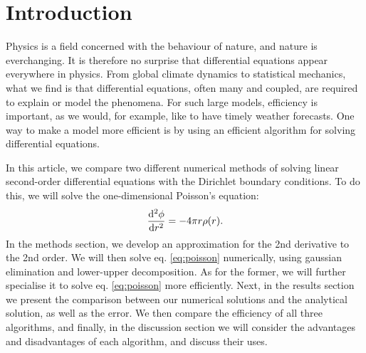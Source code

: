 \section{Introduction}
\label{sec:introduction}

Physics is a field concerned with the behaviour of nature, and nature is
everchanging. It is therefore no surprise that differential equations appear
everywhere in physics. From global climate dynamics to statistical mechanics,
what we find is that differential equations, often many and coupled, are
required to explain or model the phenomena. For such large models, efficiency
is important, as we would, for example, like to have timely weather forecasts.
One way to make a model more efficient is by using an efficient algorithm for
solving differential equations.

In this article, we compare two different numerical methods of solving linear
second-order differential equations with the Dirichlet boundary conditions.
To do this, we will solve the one-dimensional Poisson's equation:
  \begin{equation}
  \label{eq:poisson}
    \dv[2]{\phi}{r} = -4\pi r \rho\qty(r).
  \end{equation}
In the methods section, we develop an approximation for the
2nd derivative to the 2nd order. We will then solve eq. \ref{eq:poisson}
numerically, using gaussian elimination and lower-upper decomposition. As for
the former, we will further specialise it to solve eq. \ref{eq:poisson} more
efficiently. Next, in the results section we present the comparison
between our numerical solutions and the analytical solution, as well as the error.
We then compare the efficiency of all three algorithms, and finally, in the
discussion section we will consider the advantages and disadvantages
of each algorithm, and discuss their uses.
